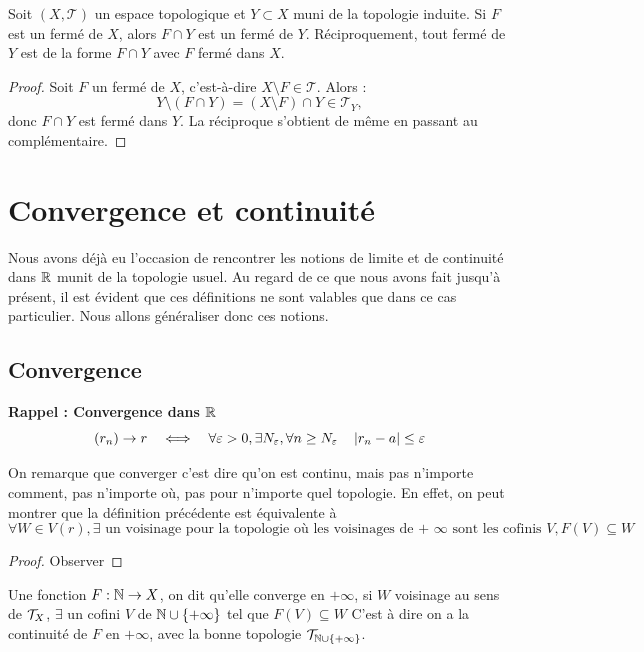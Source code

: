 \begin{proposition}
Soit $(X, \mathcal{T})$ un espace topologique et $Y \subset X$ muni de la topologie induite. Si $F$ est un fermé de $X$, alors $F \cap Y$ est un fermé de $Y$. Réciproquement, tout fermé de $Y$ est de la forme $F \cap Y$ avec $F$ fermé dans $X$.
\end{proposition}

\begin{proof}
Soit $F$ un fermé de $X$, c'est-à-dire $X \setminus F \in \mathcal{T}$. Alors :
$$Y \setminus (F \cap Y) = (X \setminus F) \cap Y \in \mathcal{T}_Y,$$
donc $F \cap Y$ est fermé dans $Y$. La réciproque s'obtient de même en passant au complémentaire. 
\end{proof}

\section{Convergence et continuité}
Nous avons déjà eu l'occasion de rencontrer les notions de limite et de continuité dans $\mathbb{R}$ munit de la topologie usuel. Au regard de ce que nous avons fait jusqu'à présent, il est évident que ces définitions ne sont valables que dans ce cas particulier. Nous allons généraliser donc ces notions.
\subsection{Convergence}
\textbf{Rappel : Convergence dans $\mathbb{R}$}\\
\[
(r_n)\to r \quad \Longleftrightarrow \quad \forall \varepsilon>0, \exists N_\varepsilon , \forall n \ge N_\varepsilon \quad \left| r_n-a \right| \le \varepsilon
\]

On remarque que converger c'est dire qu'on est continu, mais pas n'importe comment, pas n'importe où, pas pour n'importe quel topologie. En effet, on peut montrer que la définition précédente est équivalente à
\[
\forall W \in V(r), \exists \text{ un voisinage pour la topologie où les voisinages de + } \infty \text{ sont les cofinis }V, F(V) \subseteq W
\]

\begin{proof}
    Observer
\end{proof}

\begin{definition}
    Une fonction $F: \mathbb{N} \to X$, on dit qu'elle converge en $+\infty$, si $W$ voisinage au sens de $\mathcal{T}_X$, $\exists$ un cofini $V$ de $\mathbb{N} \cup \{+\infty\}$ tel que $F(V)\subseteq W$
    C'est à dire on a la continuité de $F$ en $+\infty$, avec la bonne topologie $\mathcal{T}_{\mathbb{N}\cup \{+\infty\}}$.
\end{definition}


